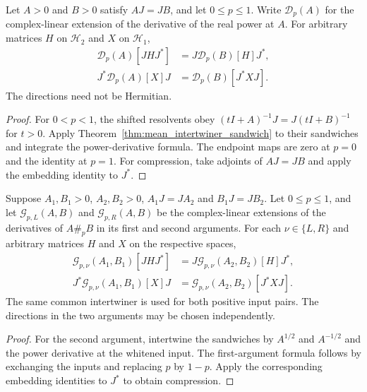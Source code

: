 \begin{theorem}
\label{thm:mean_intertwiner_power_derivative}
\leanok
{}
Let $A>0$ and $B>0$ satisfy $AJ=JB$, and let $0\le p\le1$. Write
$\mathcal D_p(A)$ for the complex-linear extension of the derivative of
the real power at $A$. For arbitrary matrices $H$ on $\mathcal H_2$ and
$X$ on $\mathcal H_1$,
\begin{align}
 \mathcal D_p(A)[JHJ^*]&=J\mathcal D_p(B)[H]J^*,
 \label{eq:mean_power_derivative_embed}\\
 J^*\mathcal D_p(A)[X]J&=\mathcal D_p(B)[J^*XJ].
 \label{eq:mean_power_derivative_compress}
\end{align}
The directions need not be Hermitian.
\end{theorem}
\begin{proof}\leanok
{}
For $0<p<1$, the shifted resolvents obey
$(tI+A)^{-1}J=J(tI+B)^{-1}$ for $t>0$. Apply
Theorem~\ref{thm:mean_intertwiner_sandwich} to their sandwiches and integrate
the power-derivative formula. The endpoint maps are zero at $p=0$ and the
identity at $p=1$. For compression, take adjoints of $AJ=JB$ and apply the
embedding identity to $J^*$.
\end{proof}

\begin{theorem}
\label{thm:mean_intertwiner_vertex_derivative}
\leanok
{}
Suppose $A_1,B_1>0$, $A_2,B_2>0$, $A_1J=JA_2$ and $B_1J=JB_2$.
Let $0\le p\le1$, and let $\mathcal G_{p,L}(A,B)$ and
$\mathcal G_{p,R}(A,B)$ be the complex-linear extensions of the derivatives
of $A\#_pB$ in its first and second arguments. For each
$\nu\in\{L,R\}$ and arbitrary matrices $H$ and $X$ on the respective spaces,
\begin{align}
 \mathcal G_{p,\nu}(A_1,B_1)[JHJ^*]
   &=J\mathcal G_{p,\nu}(A_2,B_2)[H]J^*,
 \label{eq:mean_vertex_derivative_embed}\\
 J^*\mathcal G_{p,\nu}(A_1,B_1)[X]J
   &=\mathcal G_{p,\nu}(A_2,B_2)[J^*XJ].
 \label{eq:mean_vertex_derivative_compress}
\end{align}
The same common intertwiner is used for both positive input pairs.
The directions in the two arguments may be chosen independently.
\end{theorem}
\begin{proof}\leanok
{}
For the second argument, intertwine the sandwiches by $A^{1/2}$ and
$A^{-1/2}$ and the power derivative at the whitened input. The first-argument
formula follows by exchanging the inputs and replacing $p$ by $1-p$.
Apply the corresponding embedding identities to $J^*$ to obtain compression.
\end{proof}

